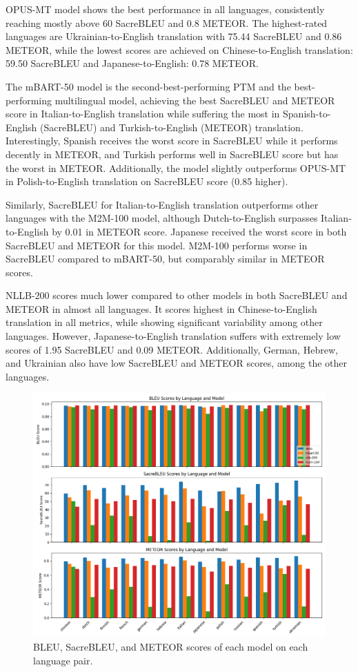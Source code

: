 \documentclass[a4paper, 11pt]{article}
\begin{document}
OPUS-MT model shows the best performance in all languages, consistently reaching mostly above 60 SacreBLEU and 0.8 METEOR. The highest-rated languages are Ukrainian-to-English translation with 75.44 SacreBLEU and 0.86 METEOR, while the lowest scores are achieved on Chinese-to-English translation: 59.50 SacreBLEU and Japanese-to-English: 0.78 METEOR.

The mBART-50 model is the second-best-performing PTM and the best-performing multilingual model, achieving the best SacreBLEU and METEOR score in Italian-to-English translation while suffering the most in Spanish-to-English (SacreBLEU) and Turkish-to-English (METEOR) translation. Interestingly, Spanish receives the worst score in SacreBLEU while it performs decently in METEOR, and Turkish performs well in SacreBLEU score but has the worst in METEOR. Additionally, the model slightly outperforms OPUS-MT in Polish-to-English translation on SacreBLEU score (0.85 higher).

Similarly, SacreBLEU for Italian-to-English translation outperforms other languages with the M2M-100 model, although Dutch-to-English surpasses Italian-to-English by 0.01 in METEOR score. Japanese received the worst score in both SacreBLEU and METEOR for this model. M2M-100 performs worse in SacreBLEU compared to mBART-50, but comparably similar in METEOR scores.

NLLB-200 scores much lower compared to other models in both SacreBLEU and METEOR in almost all languages. It scores highest in Chinese-to-English translation in all metrics, while showing significant variability among other languages. However, Japanese-to-English translation suffers with extremely low scores of 1.95 SacreBLEU and 0.09 METEOR. Additionally, German, Hebrew, and Ukrainian also have low SacreBLEU and METEOR scores, among the other languages.

\begin{figure}[htbp]
    \centering
    \includegraphics[width=1\linewidth]{figures/metrics_bar.png}
    \caption{BLEU, SacreBLEU, and METEOR scores of each model on each language pair.}
    \label{fig:result_visual}
\end{figure}
\end{document}
